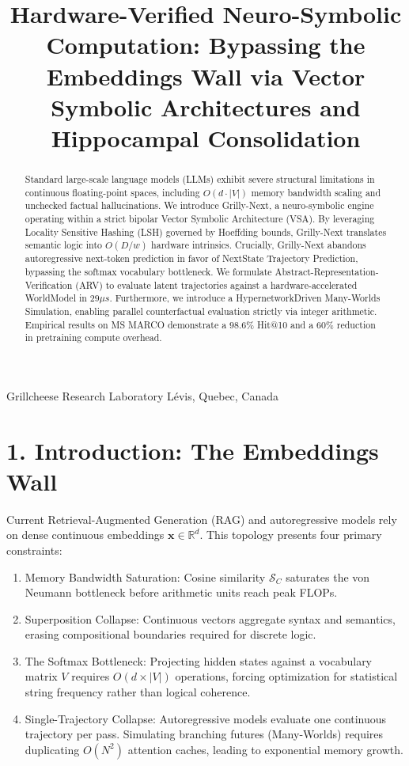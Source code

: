 \documentclass[10pt]{article}
\title{Hardware-Verified Neuro-Symbolic Computation: Bypassing the Embeddings Wall via Vector Symbolic Architectures and Hippocampal Consolidation }
\author{}
\date{}
\begin{document}
\maketitle
\captionsetup{singlelinecheck=false}
Grillcheese Research Laboratory Lévis, Quebec, Canada

\begin{abstract}
Standard large-scale language models (LLMs) exhibit severe structural limitations in continuous floating-point spaces, including $O(d \cdot|V|)$ memory bandwidth scaling and unchecked factual hallucinations. We introduce Grilly-Next, a neuro-symbolic engine operating within a strict bipolar Vector Symbolic Architecture (VSA). By leveraging Locality Sensitive Hashing (LSH) governed by Hoeffding bounds, Grilly-Next translates semantic logic into $O(D / w)$ hardware intrinsics. Crucially, Grilly-Next abandons autoregressive next-token prediction in favor of NextState Trajectory Prediction, bypassing the softmax vocabulary bottleneck. We formulate Abstract-Representation-Verification (ARV) to evaluate latent trajectories against a hardware-accelerated WorldModel in $29 \mu s$. Furthermore, we introduce a HypernetworkDriven Many-Worlds Simulation, enabling parallel counterfactual evaluation strictly via integer arithmetic. Empirical results on MS MARCO demonstrate a $98.6 \%$ Hit@10 and a 60\% reduction in pretraining compute overhead.
\end{abstract}

\section*{1. Introduction: The Embeddings Wall}
Current Retrieval-Augmented Generation (RAG) and autoregressive models rely on dense continuous embeddings $\mathbf{x} \in \mathbb{R}^{d}$. This topology presents four primary constraints:

\begin{enumerate}
  \item Memory Bandwidth Saturation: Cosine similarity $\mathcal{S}_{C}$ saturates the von Neumann bottleneck before arithmetic units reach peak FLOPs.
  \item Superposition Collapse: Continuous vectors aggregate syntax and semantics, erasing compositional boundaries required for discrete logic.
  \item The Softmax Bottleneck: Projecting hidden states against a vocabulary matrix $V$ requires $O(d \times|V|)$ operations, forcing optimization for statistical string frequency rather than logical coherence.
  \item Single-Trajectory Collapse: Autoregressive models evaluate one continuous trajectory per pass. Simulating branching futures (Many-Worlds) requires duplicating $O\left(N^{2}\right)$ attention caches, leading to exponential memory growth.
\end{enumerate}
\end{document}
